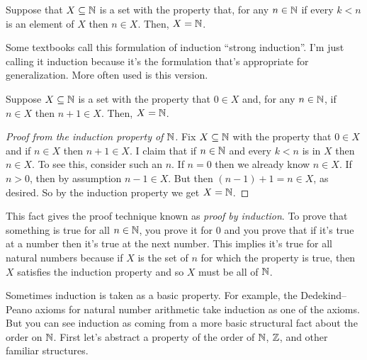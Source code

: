 \documentclass[10pt]{amsart}
\begin{document}
\begin{fact}
Suppose that $X \subseteq \mathbb{N}$ is a set with the property that, for any $n \in \mathbb{N}$ if every $k < n$ is an element of $X$ then $n \in X$. Then, $X = \mathbb{N}$.
\end{fact}

Some textbooks call this formulation of induction ``strong induction''. I'm just calling it induction because it's the formulation that's appropriate for generalization. More often used is this version.

\begin{fact}
Suppose $X \subseteq \mathbb{N}$ is a set with the property that $0 \in X$ and, for any $n \in \mathbb{N}$, if $n \in X$ then $n+1 \in X$. Then, $X = \mathbb{N}$.
\end{fact}

\begin{proof}[Proof from the induction property of $\mathbb{N}$]
Fix $X \subseteq \mathbb{N}$ with the property that $0 \in X$ and if $n \in X$ then $n+1 \in X$. I claim that if $n \in \mathbb{N}$ and every $k < n$ is in $X$ then $n \in X$. To see this, consider such an $n$. If $n = 0$ then we already know $n \in X$. If $n > 0$, then by assumption $n-1 \in X$. But then $(n-1)+1 = n \in X$, as desired. So by the induction property we get $X = \mathbb{N}$.
\end{proof}

This fact gives the proof technique known as \emph{proof by induction}. To prove that something is true for all $n \in \mathbb{N}$, you prove it for $0$ and you prove that if it's true at a number then it's true at the next number. This implies it's true for all natural numbers because if $X$ is the set of $n$ for which the property is true, then $X$ satisfies the induction property and so $X$ must be all of $\mathbb{N}$.

Sometimes induction is taken as a basic property. For example, the Dedekind--Peano axioms for natural number arithmetic take induction as one of the axioms. But you can see induction as coming from a more basic structural fact about the order on $\mathbb{N}$. First let's abstract a property of the order of $\mathbb{N}$, $\mathbb{Z}$, and other familiar structures.
\end{document}

